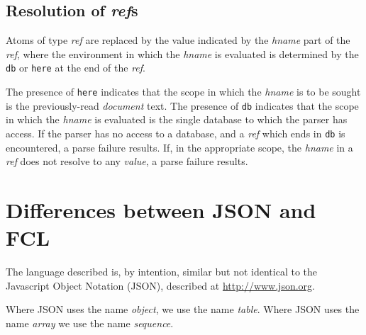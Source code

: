 \documentclass[twoside]{memarticle}
\begin{document}
\section{Resolution of \emph{ref}s\label{sec:refs}}
Atoms of type \emph{ref} are replaced
by the value indicated by the \emph{hname} part of the \emph{ref},
where the environment in which the \emph{hname} is evaluated is determined
by the \texttt{db} or \texttt{here} at the end of the \emph{ref}.

The presence of \texttt{here} indicates 
that the scope in which the \emph{hname} is to be sought
is the previously-read \emph{document} text.
The presence of \texttt{db} indicates
that the scope in which the \emph{hname} is evaluated
is the single database
to which the parser has access.
If the parser has no access to a database,
and a \emph{ref} which ends in \texttt{db} is encountered,
a parse failure results.
If,
in the appropriate scope,
the \emph{hname} in a \emph{ref} does not resolve to any \emph{value},
a parse failure results.

\appendix

\chapter{Differences between JSON and FCL\label{app:differences}}
The language described is,
by intention,
similar but not identical to the Javascript Object Notation (JSON),
described at \url{http://www.json.org}.

Where JSON uses the name \emph{object},
we use the name \emph{table}.
Where JSON uses the name \emph{array}
we use the name \emph{sequence}.
\end{document}

